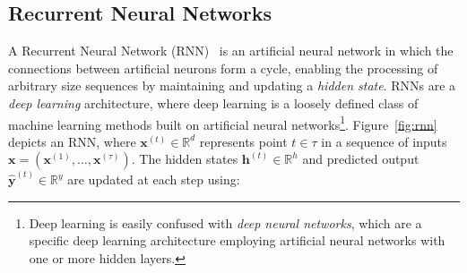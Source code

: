 


\subsection{Recurrent Neural Networks}

A Recurrent Neural Network (RNN)~\cite{Graves2012} is an artificial neural network in which the connections between artificial neurons form a cycle, enabling the processing of arbitrary size sequences by maintaining and updating a \emph{hidden state}.  RNNs are a \emph{deep learning} architecture, where deep learning is a loosely defined class of machine learning methods built on artificial neural networks\footnote{Deep learning is easily confused with \emph{deep neural networks}, which are a specific deep learning architecture employing artificial neural networks with one or more hidden layers.}. Figure~\ref{fig:rnn} depicts an RNN, where $\bm{x}^{(t)} \in \mathbb{R}^d$ represents point $t \in \tau$ in a sequence of inputs $\bm{x} = \left( \bm{x}^{(1)}, \ldots, \bm{x}^{(\tau)} \right)$. The hidden states $\bm{h}^{(t)} \in \mathbb{R}^h$ and predicted output $\bm{\hat{y}}^{(t)} \in \mathbb{R}^y$ are updated at each step using:

